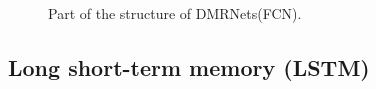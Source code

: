 \documentclass{article}
\begin{document}
 \begin{figure} [H]
  \centering
  \caption{Part of the structure of DMRNets(FCN).}
\end{figure}


\subsection{Long short-term memory (LSTM)}
\end{document}
